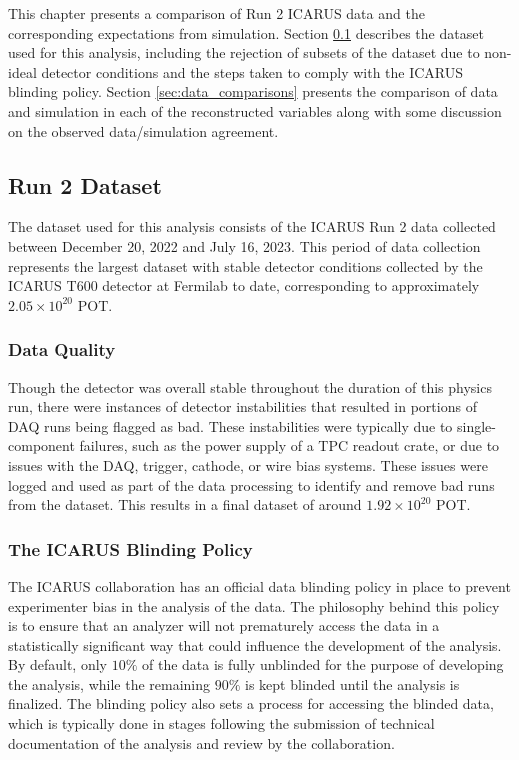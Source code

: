 This chapter presents a comparison of Run 2 ICARUS data and the corresponding expectations from simulation. Section \ref{sec:run2_dataset} describes the dataset used for this analysis, including the rejection of subsets of the dataset due to non-ideal detector conditions and the steps taken to comply with the ICARUS blinding policy. Section \ref{sec:data_comparisons} presents the comparison of data and simulation in each of the reconstructed variables along with some discussion on the observed data/simulation agreement. 


\subsection{Run 2 Dataset}
\label{sec:run2_dataset}

The dataset used for this analysis consists of the ICARUS Run 2 data collected between December 20, 2022 and July 16, 2023. This period of data collection represents the largest dataset with stable detector conditions collected by the ICARUS T600 detector at Fermilab to date, corresponding to approximately $2.05 \times 10^{20}$ POT.

\subsubsection{Data Quality}
\label{sec:data_quality}

Though the detector was overall stable throughout the duration of this physics run, there were instances of detector instabilities that resulted in portions of DAQ runs being flagged as bad. These instabilities were typically due to single-component failures, such as the power supply of a TPC readout crate, or due to issues with the DAQ, trigger, cathode, or wire bias systems. These issues were logged and used as part of the data processing to identify and remove bad runs from the dataset. This results in a final dataset of around $1.92 \times 10^{20}$ POT.

\subsubsection{The ICARUS Blinding Policy}
\label{sec:blinding_policy}

The ICARUS collaboration has an official data blinding policy in place to prevent experimenter bias in the analysis of the data. The philosophy behind this policy is to ensure that an analyzer will not prematurely access the data in a statistically significant way that could influence the development of the analysis. By default, only $10\%$ of the data is fully unblinded for the purpose of developing the analysis, while the remaining $90\%$ is kept blinded until the analysis is finalized. The blinding policy also sets a process for accessing the blinded data, which is typically done in stages following the submission of technical documentation of the analysis and review by the collaboration. 

